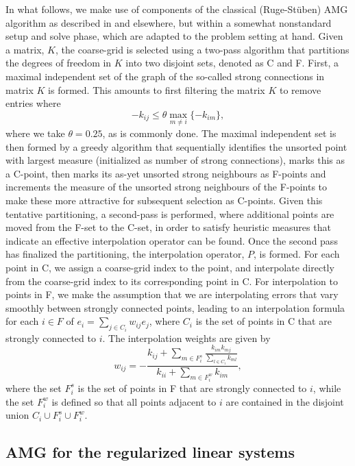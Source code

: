 In what follows, we make use of components of the classical
(Ruge-St\"uben) AMG algorithm as described
in \cite{JWRuge_KStuben_1987a} and elsewhere, but within a somewhat
nonstandard setup and solve phase, which are adapted to the problem
setting at hand.  Given a matrix, $K$, the coarse-grid is selected
using a two-pass algorithm that partitions the degrees of freedom in
$K$ into two disjoint sets, denoted as C and F.  First, a maximal
independent set of the graph of the so-called strong connections in
matrix $K$ is formed.  This amounts to first filtering the matrix $K$
to remove entries where
\[
-k_{ij} \leq \theta \max_{m\neq i} \{-k_{im}\},
\]
where we take $\theta = 0.25$, as is commonly done.  The maximal
independent set is then formed by a greedy algorithm that sequentially
identifies the unsorted point with largest measure (initialized as
number of strong connections), marks this as a C-point, then marks its
as-yet unsorted strong neighbours as F-points and increments the
measure of the unsorted strong neighbours of the F-points to make
these more attractive for subsequent selection as C-points.  Given
this tentative partitioning, a second-pass is performed, where
additional points are moved from the F-set to the C-set, in order to
satisfy heuristic measures that indicate an effective interpolation
operator can be found.  Once the second pass has finalized the
partitioning, the interpolation operator, $P$, is formed.  For each
point in C, we assign a coarse-grid index to the point, and
interpolate directly from the coarse-grid index to its corresponding
point in C.  For interpolation to points in F, we make the assumption
that we are interpolating errors that vary smoothly between strongly
connected points, leading to an interpolation formula for each $i\in
F$ of $e_i = \sum_{j\in C_i} w_{ij}e_j$, where $C_i$ is the set of
points in C that are strongly connected to $i$.  The interpolation
weights are given by
\[
w_{ij} = - \frac{k_{ij} + \displaystyle\sum_{m \in
    F_i^s}\frac{k_{im}k_{mj}}{\sum_{l \in C_i} k_{ml}}}{k_{ii} +
    \displaystyle\sum_{m \in F_i^w} k_{im}},
\]
where the set $F_i^s$ is the set of points in F that are strongly
connected to $i$, while the set $F_i^w$ is defined so that all points
adjacent to $i$ are contained in the disjoint union $C_i \cup
F_i^s \cup F_i^w$.

\subsection{AMG for the regularized linear systems}

